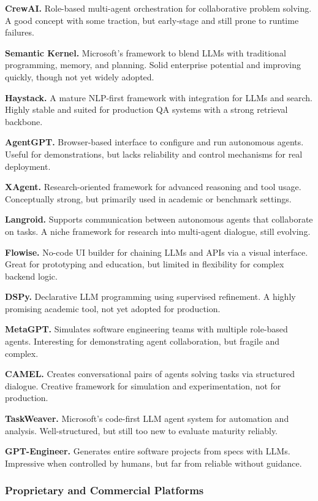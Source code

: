 \textbf{CrewAI.} Role-based multi-agent orchestration for collaborative problem solving. A good concept with some traction, but early-stage and still prone to runtime failures.

\textbf{Semantic Kernel.} Microsoft's framework to blend LLMs with traditional programming, memory, and planning. Solid enterprise potential and improving quickly, though not yet widely adopted.

\textbf{Haystack.} A mature NLP-first framework with integration for LLMs and search. Highly stable and suited for production QA systems with a strong retrieval backbone.

\textbf{AgentGPT.} Browser-based interface to configure and run autonomous agents. Useful for demonstrations, but lacks reliability and control mechanisms for real deployment.

\textbf{XAgent.} Research-oriented framework for advanced reasoning and tool usage. Conceptually strong, but primarily used in academic or benchmark settings.

\textbf{Langroid.} Supports communication between autonomous agents that collaborate on tasks. A niche framework for research into multi-agent dialogue, still evolving.

\textbf{Flowise.} No-code UI builder for chaining LLMs and APIs via a visual interface. Great for prototyping and education, but limited in flexibility for complex backend logic.

\textbf{DSPy.} Declarative LLM programming using supervised refinement. A highly promising academic tool, not yet adopted for production.

\textbf{MetaGPT.} Simulates software engineering teams with multiple role-based agents. Interesting for demonstrating agent collaboration, but fragile and complex.

\textbf{CAMEL.} Creates conversational pairs of agents solving tasks via structured dialogue. Creative framework for simulation and experimentation, not for production.

\textbf{TaskWeaver.} Microsoft’s code-first LLM agent system for automation and analysis. Well-structured, but still too new to evaluate maturity reliably.

\textbf{GPT-Engineer.} Generates entire software projects from specs with LLMs. Impressive when controlled by humans, but far from reliable without guidance.

\subsubsection*{Proprietary and Commercial Platforms}

